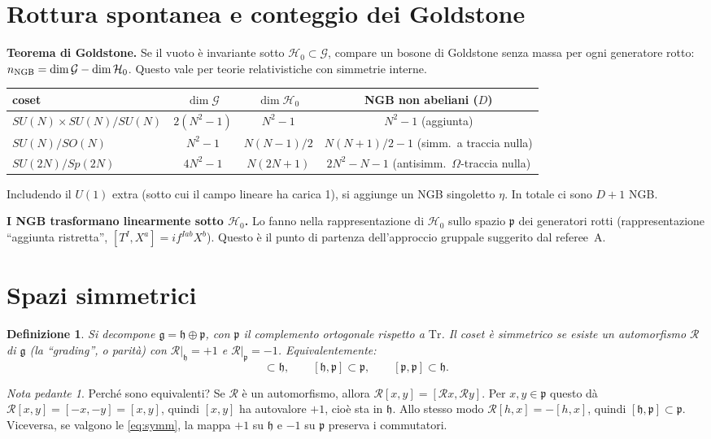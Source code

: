 \documentclass[11pt,a4paper]{article}
\numberwithin{equation}{section}
\newtheorem{defi}{Definizione}
\theoremstyle{remark}
\newtheorem*{pedante}{Nota pedante}
\newcommand{\Tr}{\mathrm{Tr}}
\newcommand{\G}{\mathcal{G}}
\newcommand{\Hg}{\mathcal{H}_0}
\newcommand{\p}{\mathfrak{p}}
\newcommand{\h}{\mathfrak{h}}
\newcommand{\g}{\mathfrak{g}}
\begin{document}
\section{Rottura spontanea e conteggio dei Goldstone}
\label{sec:ssb}

\textbf{Teorema di Goldstone.} Se il vuoto è invariante sotto $\Hg\subset\G$, compare un bosone di Goldstone senza massa per ogni generatore rotto: $n_{\rm NGB}=\dim\G-\dim\Hg$. Questo vale per teorie relativistiche con simmetrie interne.

\begin{center}
\begin{tabular}{lccc}
\hline
coset & $\dim\G$ & $\dim\Hg$ & NGB non abeliani ($D$) \\
\hline
$SU(N)\times SU(N)/SU(N)$ & $2(N^2-1)$ & $N^2-1$ & $N^2-1$ (aggiunta)\\
$SU(N)/SO(N)$ & $N^2-1$ & $N(N-1)/2$ & $N(N+1)/2-1$ (simm.\ a traccia nulla) \\
$SU(2N)/Sp(2N)$ & $4N^2-1$ & $N(2N+1)$ & $2N^2-N-1$ (antisimm.\ $\Omega$-traccia nulla)\\
\hline
\end{tabular}
\end{center}

Includendo il $U(1)$ extra (sotto cui il campo lineare ha carica 1), si aggiunge un NGB singoletto $\eta$. In totale ci sono $D+1$ NGB.

\textbf{I NGB trasformano linearmente sotto $\Hg$.} Lo fanno nella rappresentazione di $\Hg$ sullo spazio $\p$ dei generatori rotti (rappresentazione ``aggiunta ristretta'', $[T^I,X^a]=i f^{Iab}X^b$). Questo è il punto di partenza dell'approccio gruppale suggerito dal referee~A.

\section{Spazi simmetrici}
\label{sec:symm}

\begin{defi}
Si decompone $\g=\h\oplus\p$, con $\p$ il complemento ortogonale rispetto a $\Tr$. Il coset è \emph{simmetrico} se esiste un automorfismo $\mathcal R$ di $\g$ (la ``grading'', o parità) con $\mathcal R|_\h=+1$ e $\mathcal R|_\p=-1$. Equivalentemente:
\begin{equation}
[\h,\h]\subset\h,\qquad [\h,\p]\subset\p,\qquad [\p,\p]\subset\h .
\label{eq:symm}
\end{equation}
\end{defi}
\begin{pedante}
Perché sono equivalenti? Se $\mathcal R$ è un automorfismo, allora $\mathcal R[x,y]=[\mathcal Rx,\mathcal Ry]$. Per $x,y\in\p$ questo dà $\mathcal R[x,y]=[-x,-y]=[x,y]$, quindi $[x,y]$ ha autovalore $+1$, cioè sta in $\h$. Allo stesso modo $\mathcal R[h,x]=-[h,x]$, quindi $[\h,\p]\subset\p$. Viceversa, se valgono le \eqref{eq:symm}, la mappa $+1$ su $\h$ e $-1$ su $\p$ preserva i commutatori.
\end{pedante}
\end{document}
